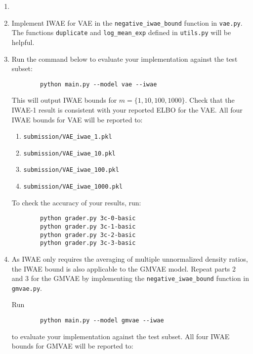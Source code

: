 \begin{enumerate}[label=(\alph*)]
    \item 

    \item {} Implement IWAE for VAE in the \texttt{negative\_iwae\_bound} function in \texttt{vae.py}. The functions \texttt{duplicate}
    and \texttt{log\_mean\_exp} defined in \texttt{utils.py} will be helpful.

    \item {} Run the command below to evaluate your implementation against the test subset:
    \begin{verbatim}
        python main.py --model vae --iwae
    \end{verbatim}

    This will output IWAE bounds for $m = \{1,10,100,1000\}$. Check that the IWAE-1 result is consistent with 
    your reported ELBO for the VAE. All four IWAE bounds for VAE will be reported to:
    \begin{enumerate}
        \item \texttt{submission/VAE\_iwae\_1.pkl}
        \item \texttt{submission/VAE\_iwae\_10.pkl}
        \item \texttt{submission/VAE\_iwae\_100.pkl}
        \item \texttt{submission/VAE\_iwae\_1000.pkl}
    \end{enumerate}

    To check the accuracy of your results, run:
    \begin{verbatim}
        python grader.py 3c-0-basic
        python grader.py 3c-1-basic
        python grader.py 3c-2-basic
        python grader.py 3c-3-basic
    \end{verbatim}

    \item {} As IWAE only requires the averaging of multiple unnormalized density ratios, the IWAE bound is also applicable 
    to the GMVAE model. Repeat parts 2 and 3 for the GMVAE by implementing the \texttt{negative\_iwae\_bound} function in 
    \texttt{gmvae.py}. 
    
    Run 
    \begin{verbatim}
        python main.py --model gmvae --iwae
    \end{verbatim}
   to evaluate your implementation against the test subset. All four IWAE bounds for GMVAE will be reported to:


\end{enumerate}
